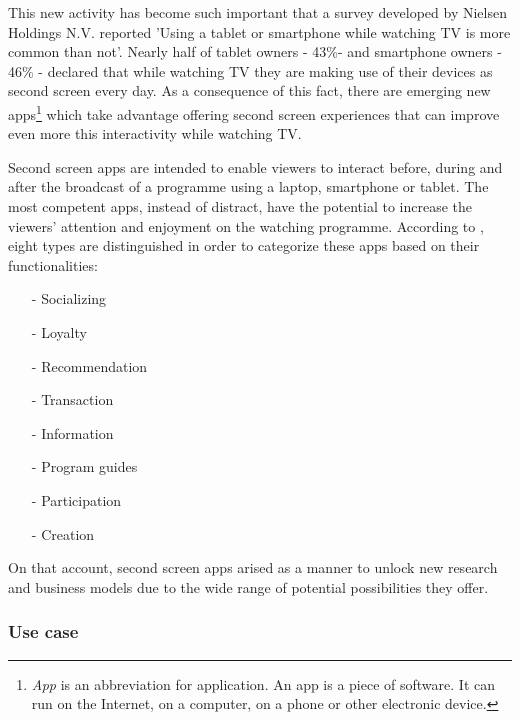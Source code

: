 \documentclass{acm_proc_article-sp}
\begin{document}
This new activity has become such important that a survey developed by Nielsen Holdings N.V. \cite{nielsentv} reported 'Using a tablet or smartphone while watching TV is more common than not'. Nearly half of tablet owners - 43\%- and smartphone owners - 46\% - declared that while watching TV they are making use of their devices as second screen every day. As a consequence of this fact, there are emerging new apps\footnote{\textit{App} is an abbreviation for application. An app is a piece of software. It can run on the Internet, on a computer, on a phone or other electronic device.} which take advantage offering second screen experiences that can improve even more this interactivity while watching TV. 

Second screen apps \cite{evolumedia1} are intended to enable viewers to interact before, during and after the broadcast of a programme using a laptop, smartphone or tablet. The most competent apps, instead of distract, have the potential to increase the viewers' attention and enjoyment on the watching programme. According to \cite{evolumedia1}, eight types are distinguished in order to categorize these apps based on their functionalities: 
\begin{itemize}
  \item[-] Socializing
  \item[-] Loyalty
  \item[-] Recommendation
  \item[-] Transaction
  \item[-] Information
  \item[-] Program guides
  \item[-] Participation
  \item[-] Creation
\end{itemize}
On that account, second screen apps arised as a manner to unlock new research and business models due to the wide range of potential possibilities they offer. 

\subsubsection{Use case}
\end{document}
